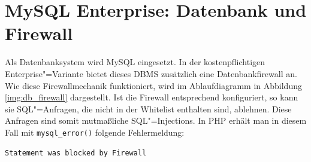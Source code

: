 \section{MySQL Enterprise: Datenbank und Firewall}

Als Datenbanksystem wird MySQL eingesetzt. In der kostenpflichtigen Enterprise"=Variante bietet dieses DBMS zusätzlich eine Datenbankfirewall an. Wie diese Firewallmechanik funktioniert, wird im Ablaufdiagramm in Abbildung \ref{img:db_firewall} dargestellt. Ist die Firewall entsprechend konfiguriert, so kann sie SQL"=Anfragen, die nicht in der Whitelist enthalten sind, ablehnen. Diese Anfragen sind somit mutmaßliche SQL"=Injections. In PHP erhält man in diesem Fall mit \texttt{mysql_error()} folgende Fehlermeldung:

\begin{verbatim}
Statement was blocked by Firewall
\end{verbatim}

